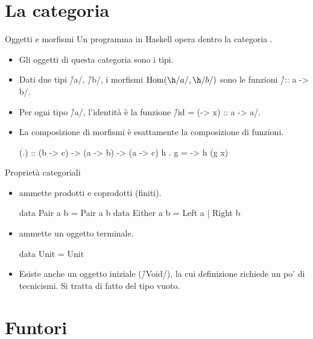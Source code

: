 \section*{La categoria \protect\Hask{}}

\begin{frame}[fragile]{\secname}{Oggetti e morfismi}
Un programma in Haskell opera dentro la categoria \Hask{}.
\begin{itemize}[<+(1)->]
\item Gli oggetti di questa categoria sono i tipi.
\item Dati due tipi \h/a/, \h/b/, i morfismi $\Hom(\h/a/, \h/b/)$ sono le funzioni \h/:: a -> b/.
\item Per ogni tipo \h/a/, l'identità è la funzione \h/id = (\x -> x) :: a -> a/.
\item La composizione di morfismi è esattamente la composizione di funzioni.

\begin{haskellcode}
(.) :: (b -> c) -> (a -> b) -> (a -> c)
h . g = \x -> h (g x)
\end{haskellcode}
\end{itemize}
\end{frame}

\begin{frame}[fragile]{\secname}{Proprietà categoriali}
\begin{itemize}[<+->]
\item \Hask{} ammette prodotti e coprodotti (finiti).

\begin{haskellcode}
data Pair a b = Pair a b
data Either a b = Left a | Right b
\end{haskellcode}

\item \Hask{} ammette un oggetto terminale.

\begin{haskellcode}
data Unit = Unit
\end{haskellcode}

\item Esiste anche un oggetto iniziale (\h/Void/), la cui definizione richiede un po' di tecnicismi. Si tratta di fatto del tipo vuoto.
\end{itemize}
\end{frame}

\section*{Funtori}

